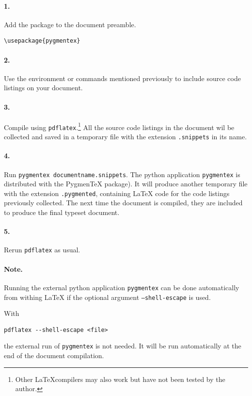 \documentclass[10pt,a4paper]{article}
\begin{document}
\paragraph{1.} Add the package to the document preamble.
\begin{verbatim}
\usepackage{pygmentex}
\end{verbatim}

\paragraph{2.} Use the environment or commands mentioned previously to include source
code listings on your document.

\paragraph{3.} Compile using \texttt{pdflatex}.\footnote{Other \LaTeX compilers
may also work but have not been tested by the author.}
All the source code listings in the document wil be collected and saved in a
temporary file with the extension \texttt{.snippets} in its name.

\paragraph{4.} Run \texttt{pygmentex documentname.snippets}.
The python application \texttt{pygmentex} is
distributed with the Pygmen\TeX{} package).
It will produce another temporary file with the extension
\texttt{.pygmented}, containing \LaTeX{} code for the code listings
previously collected. The next time the document is compiled, they are
included to produce the final typeset document.

\paragraph{5.} Rerun \texttt{pdflatex} as usual.

\paragraph{Note.} Running the external python application
\texttt{pygmentex} can be done automatically from withing \LaTeX{} if
the optional argument \texttt{--shell-escape} is used.

With
\begin{verbatim}
pdflatex --shell-escape <file>
\end{verbatim}
the external run of \texttt{pygmentex} is not needed. It will be run
automatically at the end of the document compilation.
\end{document}
